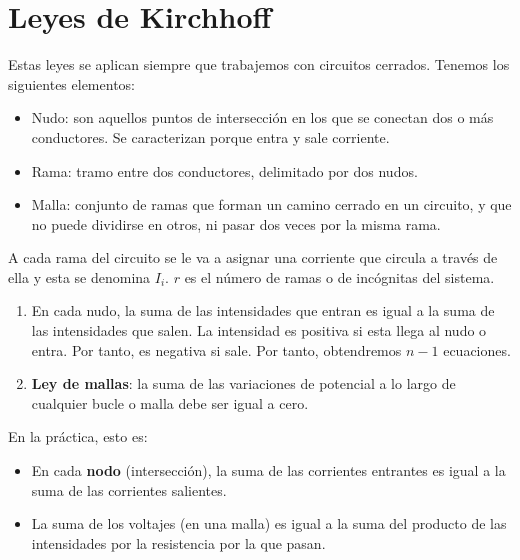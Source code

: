 \documentclass{./FisicaII.tex}
\begin{document}
\section{Leyes de Kirchhoff}
Estas leyes se aplican siempre que trabajemos con circuitos cerrados.
Tenemos los siguientes elementos:
\begin{itemize}
	\item Nudo: son aquellos puntos de intersección en los que se conectan dos o más conductores. Se caracterizan porque entra y sale corriente.
	\item Rama: tramo entre dos conductores, delimitado por dos nudos.
	\item Malla: conjunto de ramas que forman un camino cerrado en un circuito, y que no puede dividirse en otros, ni pasar dos veces por la misma rama.
\end{itemize}
A cada rama del circuito se le va a asignar una corriente que circula a través de ella y esta se denomina $I_{i}$. $r$ es el número de ramas o de incógnitas del sistema. 
\begin{enumerate}
	\item En cada nudo, la suma de las intensidades que entran es igual a la suma de las intensidades que salen. La intensidad es positiva si esta llega al nudo o entra. Por tanto, es negativa si sale. Por tanto, obtendremos $n-1$ ecuaciones. 
	\item \textbf{Ley de mallas}: la suma de las variaciones de potencial a lo largo de cualquier bucle o malla debe ser igual a cero.
\end{enumerate}
En la práctica, esto es:
\begin{itemize}
	\item En cada \textbf{nodo} (intersección), la suma de las corrientes entrantes es igual a la suma
	de las corrientes salientes.
	\item La suma de los voltajes (en una malla) es igual a la suma del producto de las intensidades
	por la resistencia por la que pasan.
\end{itemize}
\end{document}
